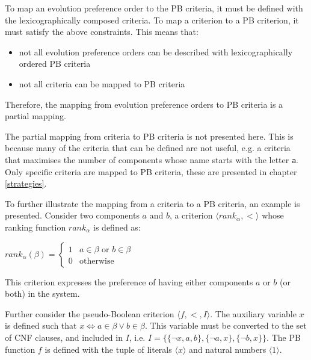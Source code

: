 To map an evolution preference order to the PB criteria,
it must be defined with the lexicographically composed criteria.
To map a criterion to a PB criterion, it must satisfy the above constraints.
This means that:
\begin{itemize}
  \item not all evolution preference orders can be described with lexicographically ordered PB criteria
  \item not all criteria can be mapped to PB criteria
\end{itemize} 
Therefore, the mapping from evolution preference orders to PB criteria is a partial mapping.

The partial mapping from \modelname criteria to PB criteria is not presented here.
This is because many of the \modelname criteria that can be defined are not useful, 
e.g. a criteria that maximises the number of components whose name starts with the letter \texttt{a}.
Only specific criteria are mapped to PB criteria, these are presented in chapter \ref{strategies}. 

To further illustrate the mapping from a \modelname criteria to a PB criteria, an example is presented.
Consider two components $a$ and $b$, a criterion $\langle rank_{\alpha},< \rangle$ whose ranking function $rank_{\alpha}$ is defined as:

$rank_{\alpha}(\beta) = \begin{cases} 1 & a \in \beta \text{ or } b \in \beta\\ 0 & \text{otherwise} \end{cases}$

This criterion expresses the preference of having either components $a$ or $b$ (or both) in the system.

Further consider the pseudo-Boolean criterion $\langle f, < , I \rangle$.
The auxiliary variable $x$ is defined such that $x \Leftrightarrow a \in \beta \vee b \in \beta$.
This variable must be  converted to the set of CNF clauses, and included in $I$,
i.e. $I = \{\{\neg x, a,b\}, \{\neg a,x\}, \{\neg b, x \}\}$.
The PB function $f$ is defined with the tuple of literals $\langle x \rangle$ and natural numbers $\langle 1 \rangle$.

